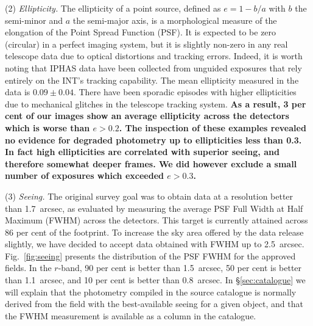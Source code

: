 \documentclass[a4paper,useAMS,usenatbib]{mn2e}
\begin{document}
(2) \emph{Ellipticity.} 
The ellipticity of a point source,
defined as $e = 1 - b / a$ 
with $b$ the semi-minor and $a$ the semi-major axis,
is a morphological measure of the elongation
of the Point Spread Function (PSF).
It is expected to be zero (circular)
in a perfect imaging system,
but it is slightly non-zero in any real telescope data 
due to optical distortions and tracking errors.
Indeed, it is worth noting
that IPHAS data have been collected
from unguided exposures that rely entirely
on the INT's tracking capability.
The mean ellipticity measured
in the data is $0.09\pm0.04$.
There have been sporadic episodes with higher ellipticities
due to mechanical glitches in the telescope tracking system.
{ \bf As a result, 3 per cent of our images show an
average ellipticity across the detectors which is worse
than $e > 0.2$.
The inspection of these examples revealed no evidence for
degraded photometry up to ellipticities less than 0.3.
In fact high ellipticities are correlated with superior seeing,
and therefore somewhat deeper frames.
We did however exclude a small number of exposures
which exceeded $e > 0.3$.}


(3) \emph{Seeing.} 
The original survey goal was to obtain data 
at a resolution better than 1.7~arcsec,
as evaluated by measuring the average PSF Full Width at Half Maximum (FWHM)
across the detectors.
This target is currently attained across 86 per cent of the footprint.
To increase the sky area offered by the data release slightly,
we have decided to accept data obtained with FWHM up to 2.5~arcsec.
Fig.~\ref{fig:seeing} presents the distribution
of the PSF FWHM for the approved fields.
In the $r$-band, 90 per cent is better than 1.5~arcsec,
50 per cent is better than 1.1~arcsec,
and 10 per cent is better than 0.8~arcsec.
In \S\ref{sec:catalogue} we will explain
that the photometry compiled in the source catalogue
is normally derived from the field with the
best-available seeing for a given object,
and that the FWHM measurement
is available as a column in the catalogue.
\end{document}
